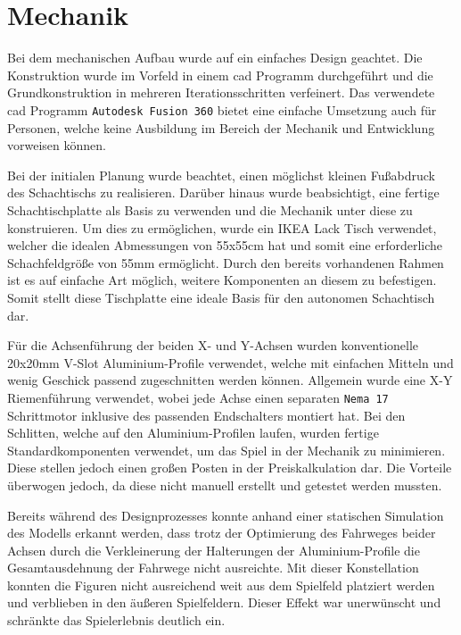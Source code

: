 \hypertarget{mechanik}{%
\section{Mechanik}\label{mechanik}}

Bei dem mechanischen Aufbau wurde auf ein einfaches Design geachtet. Die
Konstruktion wurde im Vorfeld in einem \gls{cad} Programm durchgeführt
und die Grundkonstruktion in mehreren Iterationsschritten verfeinert.
Das verwendete \gls{cad} Programm
\passthrough{\lstinline!Autodesk Fusion 360!} bietet eine einfache
Umsetzung auch für Personen, welche keine Ausbildung im Bereich der
Mechanik und Entwicklung vorweisen können.

Bei der initialen Planung wurde beachtet, einen möglichst kleinen
Fußabdruck des Schachtischs zu realisieren. Darüber hinaus wurde
beabsichtigt, eine fertige Schachtischplatte als Basis zu verwenden und
die Mechanik unter diese zu konstruieren. Um dies zu ermöglichen, wurde
ein IKEA Lack Tisch verwendet, welcher die idealen Abmessungen von
55x55cm hat und somit eine erforderliche Schachfeldgröße von 55mm
ermöglicht. Durch den bereits vorhandenen Rahmen ist es auf einfache Art
möglich, weitere Komponenten an diesem zu befestigen. Somit stellt diese
Tischplatte eine ideale Basis für den autonomen Schachtisch dar.

Für die Achsenführung der beiden X- und Y-Achsen wurden konventionelle
20x20mm V-Slot Aluminium-Profile verwendet, welche mit einfachen Mitteln
und wenig Geschick passend zugeschnitten werden können. Allgemein wurde
eine X-Y Riemenführung verwendet, wobei jede Achse einen separaten
\passthrough{\lstinline!Nema 17!} Schrittmotor inklusive des passenden
Endschalters montiert hat. Bei den Schlitten, welche auf den
Aluminium-Profilen laufen, wurden fertige Standardkomponenten verwendet,
um das Spiel in der Mechanik zu minimieren. Diese stellen jedoch einen
großen Posten in der Preiskalkulation dar. Die Vorteile überwogen
jedoch, da diese nicht manuell erstellt und getestet werden mussten.

Bereits während des Designprozesses konnte anhand einer statischen
Simulation des Modells erkannt werden, dass trotz der Optimierung des
Fahrweges beider Achsen durch die Verkleinerung der Halterungen der
Aluminium-Profile die Gesamtausdehnung der Fahrwege nicht ausreichte.
Mit dieser Konstellation konnten die Figuren nicht ausreichend weit aus
dem Spielfeld platziert werden und verblieben in den äußeren
Spielfeldern. Dieser Effekt war unerwünscht und schränkte das
Spielerlebnis deutlich ein.

